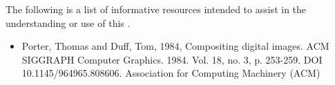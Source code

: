 
\pnum
The following is a list of informative resources intended to assist in the understanding or use of this \documenttypename{}.

\begin{itemize}
\item Porter, Thomas and Duff, Tom, 1984, Compositing digital images. ACM SIGGRAPH Computer Graphics. 1984. Vol. 18, no. 3, p. 253-259. DOI 10.1145/964965.808606. Association for Computing Machinery (ACM)
\end{itemize}
